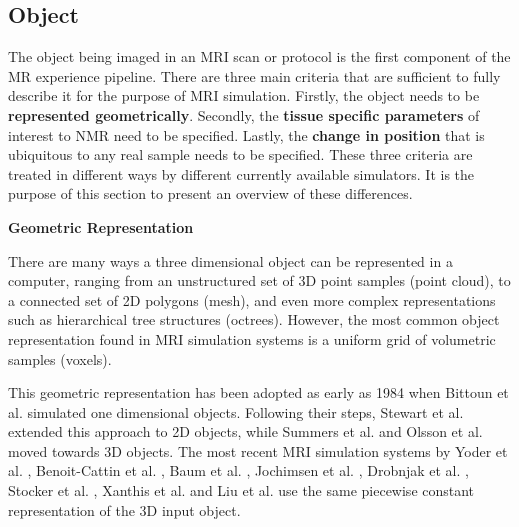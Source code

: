 \hfill

\subsection{Object}

The object being imaged in an MRI scan or protocol is the first component of the MR experience pipeline.
There are three main criteria that are sufficient to fully describe it for the purpose of MRI simulation.
Firstly, the object needs to be \textbf{represented geometrically}. 
Secondly, the \textbf{tissue specific parameters} of interest to NMR need to be specified.
Lastly, the \textbf{change in position} that is ubiquitous to any real sample needs to be specified.
These three criteria are treated in different ways by different currently available simulators. 
It is the purpose of this section to present an overview of these differences.

\hfill

\large \textbf{Geometric Representation} \normalsize

There are many ways a three dimensional object can be represented in a computer, ranging from an unstructured set of 3D point samples (point cloud), to a connected set of 2D polygons (mesh), and even more complex representations such as hierarchical tree structures (octrees).
However, the most common object representation found in MRI simulation systems is a uniform grid of volumetric samples (voxels).

\hfill

This geometric representation has been adopted as early as 1984 when Bittoun et al. \cite{Bittoun1984} simulated one dimensional objects.
Following their steps, Stewart et al. \cite{Stewart1986} extended this approach to 2D objects, while Summers et al. \cite{Summers1986} and Olsson et al. \cite{Olsson1995} moved towards 3D objects.
The most recent MRI simulation systems by 
Yoder et al. \cite{Yoder2004}, 
Benoit-Cattin et al. \cite{Benoit-Cattin2005}, 
Baum et al. \cite{Baum2011}, 
Jochimsen et al. \cite{Jochimsen2004} \cite{Jochimsen2006}, 
Drobnjak et al. \cite{Drobnjak2006} \cite{Drobnjak2010}, 
Stocker et al. \cite{Stocker2010}, 
Xanthis et al. \cite{Xanthis2014} and 
Liu et al. \cite{Liu2013} \cite{Liu2014} \cite{Liu2016} use the same piecewise constant representation of the 3D input object.

